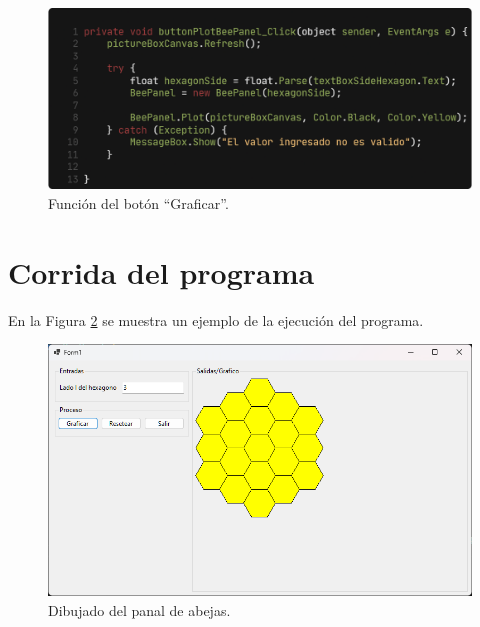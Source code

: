 \documentclass[oneside, a4paper]{article}
\begin{document}
            \begin{figure}[H]
                \centering
                \includegraphics[width=\textwidth]{button_plot_bee_panel.png}
                \caption{Función del botón ``Graficar''.}
                \label{fig:button_plot_bee_panel}
            \end{figure}

    \section{Corrida del programa}
        En la Figura \ref{fig:program_execution} se muestra un ejemplo de la ejecución del programa.

        \begin{figure}[H]
            \centering
            \includegraphics*[width=\textwidth]{program_execution}
            \caption{Dibujado del panal de abejas.}
            \label{fig:program_execution}
        \end{figure}

    \printbibliography
\end{document}
